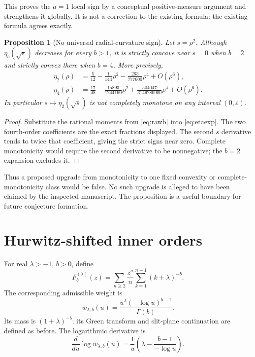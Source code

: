 \documentclass[11pt]{article}
\numberwithin{equation}{section}
\newtheorem{proposition}[theorem]{Proposition}
\theoremstyle{definition}
\theoremstyle{remark}
\begin{document}
This proves the $a=1$ local sign by a conceptual positive-measure
argument and strengthens it globally. It is not a correction to the
existing formula: the existing formula agrees exactly.

\begin{proposition}[No universal radial-curvature sign]
\label{prop:curvaturecounter}
Let $s=\rho^2$. Although $\eta_b(\sqrt s)$ decreases for every $b>1$,
it is strictly concave near $s=0$ when $b=2$ and strictly convex there
when $b=4$. More precisely,
\begin{align}
 \eta_2(\rho)&=\frac5{12}-\frac1{144}\rho^2
                    -\frac{263}{777600}\rho^4+O(\rho^6),
                    \label{eq:b2exp}\\
 \eta_4(\rho)&=\frac{17}{48}-\frac{15893}{1244160}\rho^2
                    +\frac{504047}{3149280000}\rho^4+O(\rho^6).
                    \label{eq:b4exp}
\end{align}
In particular $s\mapsto\eta_2(\sqrt s)$ is not completely monotone
on any interval $(0,\varepsilon)$.
\end{proposition}
\begin{proof}
Substitute the rational moments from \eqref{eq:rawb} into
\eqref{eq:etaexp}. The two fourth-order coefficients are the exact
fractions displayed. The second $s$ derivative tends to twice that
coefficient, giving the strict signs near zero. Complete monotonicity
would require the second derivative to be nonnegative; the $b=2$
expansion excludes it.
\end{proof}

Thus a proposed upgrade from monotonicity to one fixed convexity or
complete-monotonicity class would be false. No such upgrade is alleged
to have been claimed by the inspected manuscript. The proposition is
a useful boundary for future conjecture formation.

\section{Hurwitz-shifted inner orders}
\label{sec:shift}
For real $\lambda>-1$, $b>0$, define
\begin{equation}\label{eq:shifted}
 F_b^{(\lambda)}(z)=\sum_{n\ge2}\frac{z^n}{n}
          \sum_{k=1}^{n-1}(k+\lambda)^{-b}.
\end{equation}
The corresponding admissible weight is
\begin{equation}\label{eq:shiftweight}
 w_{\lambda,b}(u)=\frac{u^\lambda(-\log u)^{b-1}}{\Gamma(b)}.
\end{equation}
Its mass is $(1+\lambda)^{-b}$; its Green transform and slit-plane
continuation are defined as before. The logarithmic derivative is
\begin{equation}\label{eq:shiftweightderivative}
 \frac{d}{du}\log w_{\lambda,b}(u)
 =\frac1u\left(\lambda-\frac{b-1}{-\log u}\right).
\end{equation}
\end{document}
